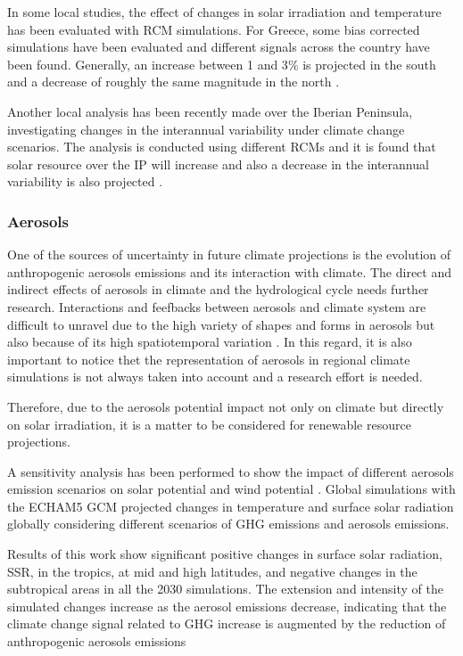 In some local studies, the effect of changes in solar irradiation and temperature has been evaluated with RCM simulations. For Greece, some bias corrected simulations have been evaluated and different signals across the country have been found. Generally, an increase between 1 and 3$\%$ is projected in the south and a decrease of roughly the same magnitude in the north \cite*{panagea2014}. 

Another local analysis has been recently made over the Iberian Peninsula, investigating changes in the interannual variability under climate change scenarios. The analysis is conducted using different RCMs and it is found that solar resource over the IP will increase and also a decrease in the interannual variability is also projected \cite*{Gil2019}.

\subsubsection{Aerosols}

One of the sources of uncertainty in future climate projections is the evolution of anthropogenic aerosols emissions and its interaction with climate. The direct and indirect effects of aerosols in climate and the hydrological cycle needs further research. Interactions and feefbacks between aerosols and climate system are difficult to unravel due to the high variety of shapes and forms in aerosols but also because of its high spatiotemporal variation \cite*{Kaufman2002}. In this regard, it is also important to notice thet the representation of aerosols in regional climate simulations is not always taken into account and a research effort is needed.  
 
Therefore, due to the aerosols potential impact not only on climate but directly on solar irradiation, it is a matter to be considered for renewable resource projections.

A sensitivity analysis has been performed to show the impact of different aerosols emission scenarios on solar potential and wind potential \cite*{Gaetani2014}. Global simulations with the ECHAM5 GCM projected changes in temperature and surface solar radiation globally considering different scenarios of GHG emissions and aerosols emissions. 

Results of this work show significant positive changes in surface solar radiation, SSR, in the tropics, at mid and high latitudes, and negative changes in the subtropical areas in all the 2030 simulations. The extension and intensity of the simulated changes increase as the aerosol emissions decrease, indicating that the climate change signal related to GHG increase is augmented by the reduction of anthropogenic aerosols emissions \cite*{Kloster2008, Kloster2010}


